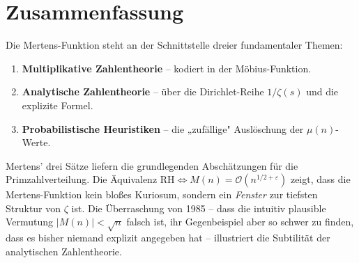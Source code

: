 \documentclass[12pt,a4paper]{amsart}
\theoremstyle{definition}
\newcommand{\BigO}{\mathcal{O}}
\begin{document}
\section*{Zusammenfassung}

Die Mertens-Funktion steht an der Schnittstelle dreier fundamentaler Themen:
\begin{enumerate}[label=(\roman*)]
  \item \textbf{Multiplikative Zahlentheorie} – kodiert in der Möbius-Funktion.
  \item \textbf{Analytische Zahlentheorie} – über die Dirichlet-Reihe
        $1/\zeta(s)$ und die explizite Formel.
  \item \textbf{Probabilistische Heuristiken} – die „zufällige"
        Auslöschung der $\mu(n)$-Werte.
\end{enumerate}

Mertens' drei Sätze liefern die grundlegenden Abschätzungen für die
Primzahlverteilung.  Die Äquivalenz
$\text{RH} \Leftrightarrow M(n)=\BigO(n^{1/2+\varepsilon})$ zeigt, dass die
Mertens-Funktion kein bloßes Kuriosum, sondern ein \emph{Fenster} zur
tiefsten Struktur von $\zeta$ ist.  Die Überraschung von 1985 – dass die
intuitiv plausible Vermutung $|M(n)| < \sqrt{n}$ falsch ist, ihr Gegenbeispiel
aber so schwer zu finden, dass es bisher niemand explizit angegeben hat –
illustriert die Subtilität der analytischen Zahlentheorie.
\end{document}
